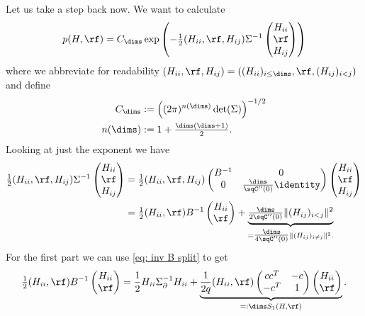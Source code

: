 Let us take a step back now. We want to calculate
\begin{equation*}
	p(H, \rf)
	=C_\dims\exp\left(
		-\tfrac12
		( H_{ii},\rf, H_{ij} )\Sigma^{-1}
		\begin{pmatrix}
			H_{ii}\\
			\rf\\
			H_{ij}
		\end{pmatrix}
	\right)
\end{equation*}
where we abbreviate for readability \((H_{ii}, \rf, H_{ij})= ((H_{ii})_{i\le
\dims}, \rf, (H_{ij})_{i<j})\) and define
\begin{align*}
	C_\dims &:= \left((2\pi)^{n(\dims)}\det(\Sigma)\right)^{-1/2}\\
	n(\dims) &:= 1 + \tfrac{\dims(\dims+1)}{2}.
\end{align*}
Looking at just the exponent we have
\begin{align*}
		\tfrac12
		( H_{ii},\rf, H_{ij} )\Sigma^{-1}
		\begin{pmatrix}
			H_{ii}\\
			\rf\\
			H_{ij}
		\end{pmatrix}
		&= 
		\tfrac12
		( H_{ii},\rf, H_{ij} )\begin{pmatrix}
			B^{-1} & 0\\
			0 & \tfrac{\dims}{\sqC''(0)}\identity
		\end{pmatrix}
		\begin{pmatrix}
			H_{ii}\\
			\rf\\
			H_{ij}
		\end{pmatrix}\\
		&= \tfrac12(H_{ii},\rf)B^{-1}\begin{pmatrix}
			H_{ii}\\ \rf
		\end{pmatrix}
		+ \underbrace{\tfrac{\dims}{2\sqC''(0)}\| (H_{ij})_{i<j}\|^2}_{
			=\tfrac{\dims}{4\sqC''(0)}\| (H_{ij})_{i\neq j}\|^2.
		}
\end{align*}
For the first part we can use \eqref{eq: inv B split} to get
\[
		\tfrac12(H_{ii},\rf)B^{-1}\begin{pmatrix}
			H_{ii}\\ \rf
		\end{pmatrix}
		= \frac12 
			H_{ii} \Sigma_\partial^{-1} H_{ii}
			+
			\underbrace{
				\frac1{2q}
				(H_{ii},\rf)
				\begin{pmatrix}
					cc^T & -c \\
					-c^T & 1
				\end{pmatrix}
				\begin{pmatrix}
					H_{ii}\\ \rf
				\end{pmatrix}
			}_{=: \dims S_1(H, \rf)}.
\]
